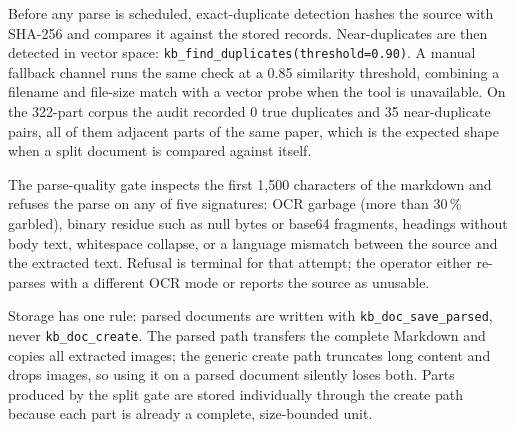 Before any parse is scheduled, exact-duplicate detection hashes the
source with SHA-256 and compares it against the stored records.
Near-duplicates are then detected in vector space:
\texttt{kb\_find\_duplicates(threshold=0.90)}. A manual fallback channel
runs the same check at a 0.85 similarity threshold, combining a
filename and file-size match with a vector probe when the tool is
unavailable. On the 322-part corpus the audit recorded 0 true
duplicates and 35 near-duplicate pairs, all of them adjacent parts of
the same paper, which is the expected shape when a split document is
compared against itself.

The parse-quality gate inspects the first 1{,}500 characters of the
markdown and refuses the parse on any of five signatures: OCR garbage
(more than 30\,\% garbled), binary residue such as null bytes or base64
fragments, headings without body text, whitespace collapse, or a
language mismatch between the source and the extracted text. Refusal is
terminal for that attempt; the operator either re-parses with a
different OCR mode or reports the source as unusable.

Storage has one rule: parsed documents are written with
\texttt{kb\_doc\_save\_parsed}, never \texttt{kb\_doc\_create}. The
parsed path transfers the complete Markdown and copies all extracted
images; the generic create path truncates long content and drops
images, so using it on a parsed document silently loses both. Parts
produced by the split gate are stored individually through the create
path because each part is already a complete, size-bounded unit.

